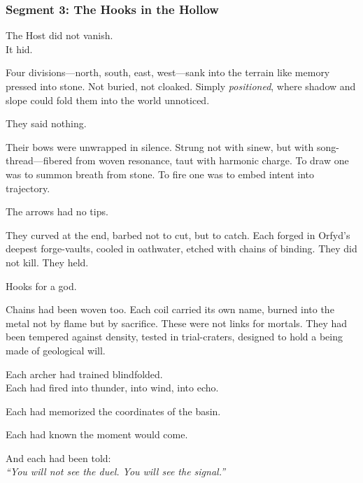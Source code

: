\documentclass[9pt]{article}
\begin{document}
\subsubsection*{Segment 3: The Hooks in the Hollow}

The Host did not vanish.\\
It hid.

\vspace{0.5em}
Four divisions---north, south, east, west---sank into the terrain like memory pressed into stone. Not buried, not cloaked. Simply \textit{positioned}, where shadow and slope could fold them into the world unnoticed.

\vspace{0.5em}
They said nothing.

\vspace{0.5em}
Their bows were unwrapped in silence. Strung not with sinew, but with song-thread---fibered from woven resonance, taut with harmonic charge. To draw one was to summon breath from stone. To fire one was to embed intent into trajectory.

\vspace{0.5em}
The arrows had no tips.

\vspace{0.5em}
They curved at the end, barbed not to cut, but to catch. Each forged in Orfyd’s deepest forge-vaults, cooled in oathwater, etched with chains of binding. They did not kill. They held.

\vspace{0.5em}
Hooks for a god.

\vspace{0.5em}
Chains had been woven too. Each coil carried its own name, burned into the metal not by flame but by sacrifice. These were not links for mortals. They had been tempered against density, tested in trial-craters, designed to hold a being made of geological will.

\vspace{0.5em}
Each archer had trained blindfolded.\\
Each had fired into thunder, into wind, into echo.

\vspace{0.5em}
Each had memorized the coordinates of the basin.

\vspace{0.5em}
Each had known the moment would come.

\vspace{0.5em}
And each had been told:\\
\textit{``You will not see the duel. You will see the signal.''}
\end{document}
